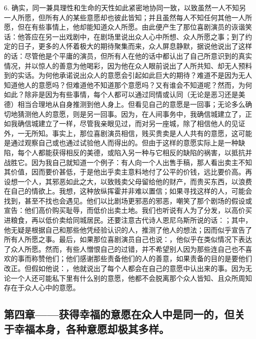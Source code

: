 6. 确实，同一兼具理性和生命的天性如此紧密地协同一致，以致虽然一人不知另一人所愿，但所有人的某些意愿却也彼此皆知；并且虽然每人不知任何其他一人所愿，但在有些事情上，他却能知道众人所愿。由此便产生了那位喜剧演员的诙谐笑话：他答应在另一出戏剧中，在剧场里说出众人心中所想、众人所愿之事；到了约定的日子，更多的人怀着极大的期待聚集而来，众人屏息静默，据说他说出了这样的话：尽管他是个平庸的演员，但所有人在他的话中都认出了自己所意识到的真实情况，并以惊人的善意为他喝彩，因为他在众人眼前说出了人所共知、却无人预料到的实话。为何他承诺说出众人的意愿会引起如此巨大的期待？难道不是因为无人知道他人的意愿吗？但难道他不知道那个意愿吗？又有谁会不知道呢？然而，为何如此？除非是因为有些事情，每个人都可以通过同情或认同（无论是恶习还是美德）相当合理地从自身推测到他人身上。但看见自己的意愿是一回事；无论多么确切地猜测他人的意愿，则是另一回事。因为，在人间事务中，我确信城建立了，正如我确信城建立了一样，尽管我亲眼见过，而对另一座城，除了相信他人的见证外，一无所知。事实上，那位喜剧演员相信，贱买贵卖是人人共有的意愿，这可能是通过观察自己或也通过试验他人而得出的。但由于这样的意愿实际上是一种缺陷，每个人都能获得相反的美德，或陷入另一种与它相反的缺陷的祸害，以抵抗并战胜它。因为我自己就知道一个例子：有人向一个人出售手稿，那人看出卖主不知其价值，因而要价甚低，于是他出乎卖主意料地付了公平的价钱，远比要价高。再设想一个人，其邪恶如此之大，以致贱卖父母留给他的财产，而贵买东西，以浪费在自己的情欲上。我想，这种放纵挥霍并非难以置信；如果寻找这样的人，可能会找到，甚至不找也会遇见。他们以比剧场更邪恶的邪恶，嘲笑了那个剧场的假设或宣告：他们高价购买耻辱，而低价出卖土地。我们也听说有人为了分发，以高价买进粮食，再以低价卖给同城居民。还要注意古代诗人恩尼乌斯所说的话：；其中，他无疑是根据自己和那些他凭经验认识的人，推测了他人的想法；因而似乎宣告了所有人所愿之事。最后，如果那位喜剧演员自己也说：，他似乎在类似情况下表达了众人所愿。然而，有些人憎恨自己的过错，并不希望别人因为那些连自己也不喜欢的事而称赞他们；他们感谢那些责备他们的人的善意，如果责备的目的是要他们改正。但假如他说：，他就说出了每个人都会在自己的意愿中认出来的事。因为无论一个人还可能私下里有什么别的意愿，他都不会脱离那个众人皆知、且众所周知存在于众人心中的意愿。\par


\subsection{第四章——获得幸福的意愿在众人中是同一的，但关于幸福本身，各种意愿却极其多样。}

